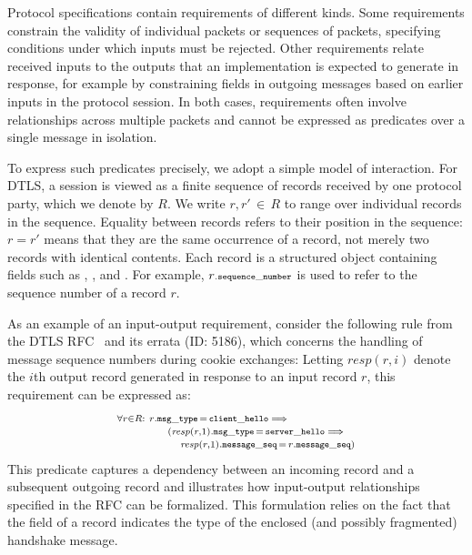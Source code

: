 Protocol specifications contain requirements of different kinds.
Some requirements constrain the validity of individual packets or sequences of packets, specifying conditions under which inputs must be rejected.
Other requirements relate received inputs to the outputs that an implementation is expected to generate in response, for example by constraining fields in outgoing messages based on earlier inputs in the protocol session.
In both cases, requirements often involve relationships across multiple packets and cannot be expressed as predicates over a single message in isolation.

To express such predicates precisely, we adopt a simple model of interaction.
For DTLS, a session is viewed as a finite sequence of records received by one protocol party, which we denote by $R$.
We write $r, r' \, \in \, R$ to range over individual records in the sequence.
Equality between records refers to their position in the sequence: $r = r'$ means that they are the same occurrence of a record, not merely two records with identical contents.
Each record is a structured object containing fields such as , , and .
For example, $r\mathtt{\scriptstyle.sequence\_number}$ is used to refer to the sequence number of a record $r$.

As an example of an input-output requirement, consider the following rule from the
DTLS RFC~\cite[p.~17]{RFC6347} and its errata (ID: 5186), which concerns the handling
of message sequence numbers during cookie exchanges:
%
%
%
Letting $\mathit{resp}(r,i)$ denote the $i$th output record generated in response to an input record $r$, this requirement can be expressed as:
%
\begin{equation}\label{const:msnsame}\normalsize
	\begin{split}
		& \scriptstyle \forall r \in R :\ r\mathtt{\scriptstyle.msg\_type}\, =\, \mathtt{\scriptstyle client\_hello} \implies \\[-5pt]
		& \scriptstyle \qquad\qquad (\mathit{resp}(r,1)\mathtt{\scriptstyle.msg\_type}\, =\, \mathtt{\scriptstyle server\_hello} \implies \\[-5pt]
		& \scriptstyle \qquad\qquad\quad  \mathit{resp}(r,1)\mathtt{\scriptstyle.message\_seq}\, =\, r\mathtt{\scriptstyle.message\_seq})
	\end{split}
\end{equation}
%
This predicate captures a dependency between an incoming record and a subsequent outgoing record and illustrates how input-output relationships specified in the RFC can be formalized.
This formulation relies on the fact that the  field of a record indicates the type of the enclosed (and possibly fragmented) handshake message.

